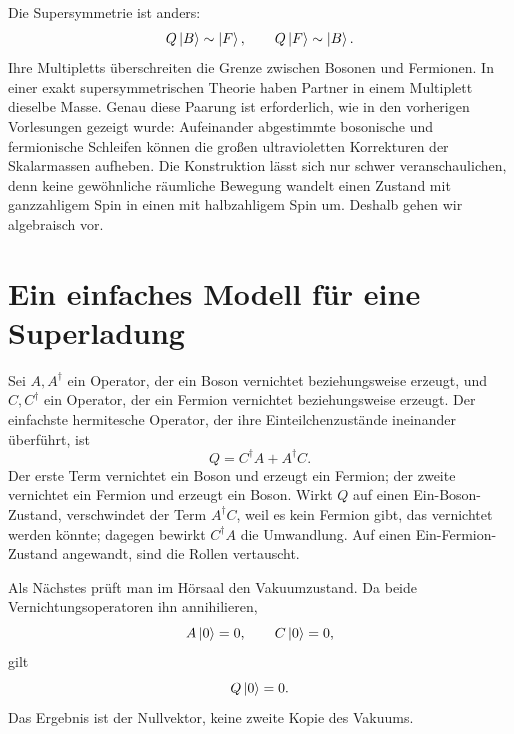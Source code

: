 Die Supersymmetrie ist anders:
\begin{equation}
Q\left\lvert B\right\rangle\sim\left\lvert F\right\rangle,
\qquad
Q\left\lvert F\right\rangle\sim\left\lvert B\right\rangle.
\end{equation}
Ihre Multipletts überschreiten die Grenze zwischen Bosonen und Fermionen. In einer exakt supersymmetrischen Theorie haben Partner in einem Multiplett dieselbe Masse. Genau diese Paarung ist erforderlich, wie in den vorherigen Vorlesungen gezeigt wurde: Aufeinander abgestimmte bosonische und fermionische Schleifen können die großen ultravioletten Korrekturen der Skalarmassen aufheben. Die Konstruktion lässt sich nur schwer veranschaulichen, denn keine gewöhnliche räumliche Bewegung wandelt einen Zustand mit ganzzahligem Spin in einen mit halbzahligem Spin um. Deshalb gehen wir algebraisch vor.

\section{Ein einfaches Modell für eine Superladung}

Sei \(A,A^\dagger\) ein Operator, der ein Boson vernichtet beziehungsweise erzeugt, und \(C,C^\dagger\) ein Operator, der ein Fermion vernichtet beziehungsweise erzeugt. Der einfachste hermitesche Operator, der ihre Einteilchenzustände ineinander überführt, ist
\begin{equation}
Q=C^\dagger A+A^\dagger C.
\end{equation}
Der erste Term vernichtet ein Boson und erzeugt ein Fermion; der zweite vernichtet ein Fermion und erzeugt ein Boson. Wirkt \(Q\) auf einen Ein-Boson-Zustand, verschwindet der Term \(A^\dagger C\), weil es kein Fermion gibt, das vernichtet werden könnte; dagegen bewirkt \(C^\dagger A\) die Umwandlung. Auf einen Ein-Fermion-Zustand angewandt, sind die Rollen vertauscht.

\begin{classroomqa}
\end{classroomqa}

Als Nächstes prüft man im Hörsaal den Vakuumzustand. Da beide Vernichtungsoperatoren ihn annihilieren,
\begin{equation}
A\left\lvert0\right\rangle=0,\qquad C\left\lvert0\right\rangle=0,
\end{equation}
gilt
\begin{equation}
Q\left\lvert0\right\rangle=0.
\end{equation}
Das Ergebnis ist der Nullvektor, keine zweite Kopie des Vakuums.

